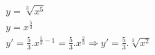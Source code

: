 \begin{ex}
\begin{align}
&y=\sqrt[3]{x^5}\nonumber\\
&y=x^\frac{5}{3}\nonumber\\
&y'=\frac{5}{3}.x^{\frac{5}{3}-1}=\frac{5}{3}.x^\frac{2}{3}\Rightarrow y'=\frac{5}{3}.\sqrt[3]{x^2}\nonumber
\end{align}
\end{ex}